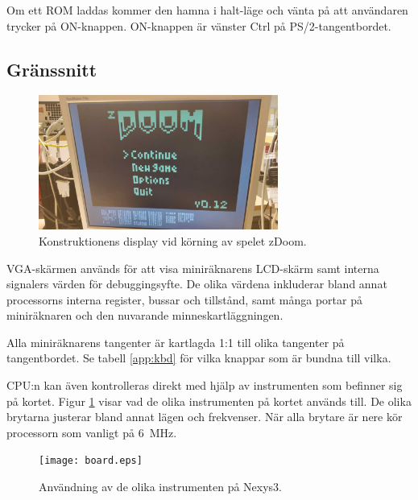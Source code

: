 \documentclass[main.tex]{subfiles}
\begin{document}
Om ett ROM laddas kommer den hamna i halt-läge och vänta på att användaren
trycker på ON-knappen. ON-knappen är vänster Ctrl på PS/2-tangentbordet.

\subsection{Gränssnitt}
\begin{figure}
    \centering
    \includegraphics[width=0.7\textwidth,bb=0 0 1152 648]{img/monitor_small.jpg}
    \caption{Konstruktionens display vid körning av spelet zDoom.}
\end{figure}

VGA-skärmen används för att visa miniräknarens LCD-skärm samt interna signalers
värden för debuggingsyfte. De olika värdena inkluderar bland annat processorns
interna register, bussar och tillstånd, samt många portar på miniräknaren och
den nuvarande minneskartläggningen.

Alla miniräknarens tangenter är kartlagda 1:1 till olika tangenter på
tangentbordet. Se tabell \ref{app:kbd} för vilka knappar som är bundna till
vilka.

CPU:n kan även kontrolleras direkt med hjälp av instrumenten som befinner sig
på kortet. Figur \ref{fig:interface} visar vad de olika instrumenten på kortet
används till. De olika brytarna justerar bland annat lägen och frekvenser. När
alla brytare är nere kör processorn som vanligt på \SI{6}{\mega\hertz}.

\begin{figure}[b]
    \centering
    \texttt{[image: board.eps]}
    \caption{Användning av de olika instrumenten på Nexys3.}
    \label{fig:interface}
\end{figure}
\end{document}
